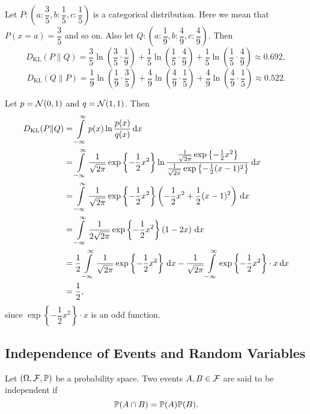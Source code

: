 \begin{example}
 Let $P:\left(a:\dfrac{3}{5}, b:\dfrac{1}{5}, c:\dfrac{1}{5}\right)$ is a categorical distribution. Here we mean that $P(x=a)=\dfrac{3}{5}$ and so on. Also let $Q:\left(a:\dfrac{1}{9}, b:\dfrac{4}{9}, c:\dfrac{4}{9}\right)$. Then
 $$D_{\mathrm{KL}}(P\|Q)=\dfrac{3}{5}\ln\left(\dfrac{3}{5}\cdot \dfrac{1}{9}\right)+\dfrac{1}{5}\ln\left(\dfrac{1}{5}\cdot \dfrac{4}{9}\right)+\dfrac{1}{5}\ln\left(\dfrac{1}{5}\cdot \dfrac{4}{9}\right)\approx 0.692,$$
 $$D_{\mathrm{KL}}(Q\|P)=\dfrac{1}{9}\ln\left(\dfrac{1}{9}\cdot \dfrac{3}{5}\right)+\dfrac{4}{9}\ln\left(\dfrac{4}{9}\cdot \dfrac{1}{5}\right)+\dfrac{4}{9}\ln\left(\dfrac{4}{9}\cdot \dfrac{1}{5}\right)\approx 0.522.$$
\end{example}

\begin{example}
 Let $p=\mathcal{N}(0,1)$ and $q=\mathcal{N}(1,1)$. Then
 \begin{align*}
  D_{\mathrm{KL}}(P\|Q)
   & =\int\limits_{-\infty}^\infty p(x)\ln\dfrac{p(x)}{q(x)}\,\mathrm{d} x                                                                                                                                                                \\
   & =\int\limits_{-\infty}^\infty \dfrac{1}{\sqrt{2\pi}}\exp\left\{-\dfrac{1}{2}x^2\right\}\ln\dfrac{\frac{1}{\sqrt{2\pi}}\exp\left\{-\frac{1}{2}x^2\right\}}{\frac{1}{\sqrt{2\pi}}\exp\left\{-\frac{1}{2}(x-1)^2\right\}}\,\mathrm{d} x \\
   & =\int\limits_{-\infty}^\infty \dfrac{1}{\sqrt{2\pi}}\exp\left\{-\dfrac{1}{2}x^2\right\}\left(-\dfrac{1}{2}x^2+\dfrac{1}{2}(x-1)^2\right)\,\mathrm{d} x                                                                               \\
   & =\int\limits_{-\infty}^\infty \dfrac{1}{2\sqrt{2\pi}}\exp\left\{-\dfrac{1}{2}x^2\right\}\left(1-2x\right)\,\mathrm{d} x                                                                                                              \\
   & =\dfrac{1}{2}\int\limits_{-\infty}^\infty\dfrac{1}{\sqrt{2\pi}}\exp\left\{-\dfrac{1}{2}x^2\right\}\,\mathrm{d} x-\dfrac{1}{\sqrt{2\pi}}\int\limits_{-\infty}^\infty\exp\left\{-\dfrac{1}{2}x^2\right\}\cdot x\,\mathrm{d} x                    \\
   & =\dfrac{1}{2},
 \end{align*}
 since $\exp\left\{-\dfrac{1}{2}x^2\right\}\cdot x$ is an odd function.
\end{example}

\subsection{Independence of Events and Random Variables}
\begin{definition}
 Let $(\Omega, \mathcal{F},\mathbb{P})$ be a probability space. Two events $A,B\in\mathcal{F}$ are said to be independent if
 \begin{equation}
  \mathbb{P}(A \cap B)=\mathbb{P}(A)\mathbb{P}(B).
 \end{equation}
\end{definition}

